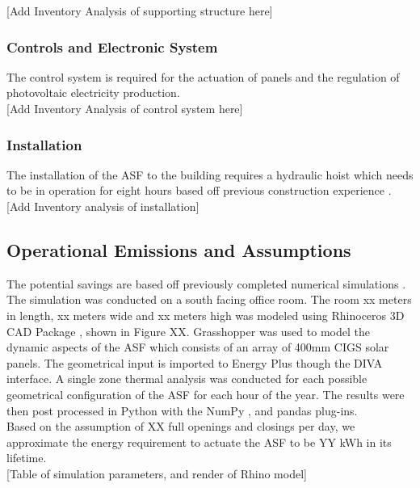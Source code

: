 [Add Inventory Analysis of supporting structure here]

\subsubsection*{Controls and Electronic System}
The control system is required for the actuation of panels and the regulation of photovoltaic electricity production.\\

[Add Inventory Analysis of control system here]

\subsubsection*{Installation}

The installation of the ASF to the building requires a hydraulic hoist which needs to be in operation for eight hours based off previous construction experience \cite{jayathissa2015abs}. \\

[Add Inventory analysis of installation]


\subsection{Operational Emissions and Assumptions}

The potential savings are based off previously completed numerical simulations \cite{jayathissa2015abs}. The simulation was conducted on a south facing office room. The room xx meters in length, xx meters wide and xx meters high was modeled using Rhinoceros 3D CAD Package \cite{Rhino}, shown in Figure XX. Grasshopper \cite{grasshopper} was used to model the dynamic aspects of the ASF which consists of an array of 400mm CIGS solar panels. The geometrical input is imported to Energy Plus \cite{energyplus} though the DIVA \cite{DIVA} interface. A single zone thermal analysis was conducted for each possible geometrical configuration of the ASF for each hour of the year. The results were then post processed in Python \cite{python} with the NumPy \cite{numpy}, and pandas \cite{pandas} plug-ins. \\

Based on the assumption of XX full openings and closings per day, we approximate the energy requirement to actuate the ASF to be YY kWh in its lifetime.\\

[Table of simulation parameters, and render of Rhino model]


